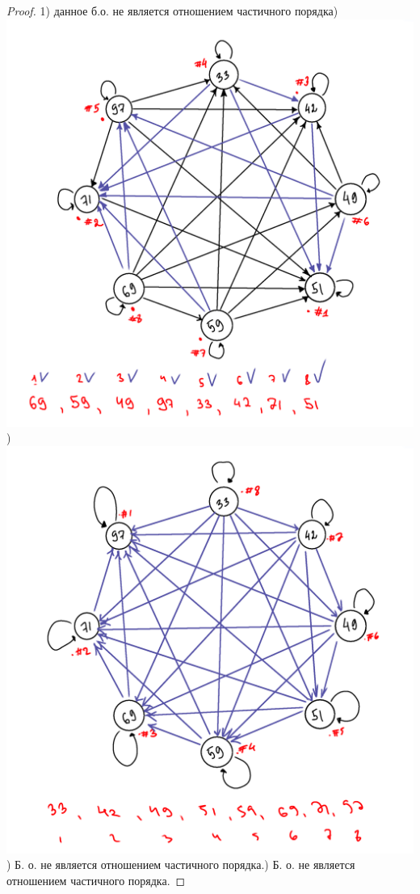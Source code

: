 \begin{proof}
    1) данное б.о. не является отношением частичного порядка)\newline
    \includegraphics{сортировка.png})\newline
    \includegraphics{сортировка2.png}) Б. о. не является отношением частичного порядка.) Б. о. не является отношением частичного порядка.\newline
\end{proof}

